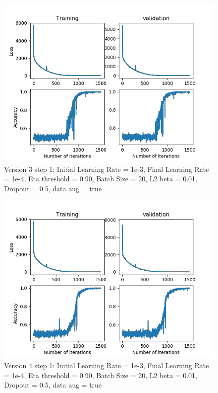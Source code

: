 \documentclass[12pt,reqno]{amsart}
\numberwithin{equation}{section}
\begin{document}
\begin{enumerate}
\begin{figure}[H]
\centering
\includegraphics[scale=0.6]{data_liquid15_version3_step1}
\caption{Version 3 step 1: Initial Learning Rate = 1e-3, Final Learning Rate = 1e-4, Eta threshold = 0.90, Batch Size = 20, L2 beta = 0.01, Dropout = 0.5, data aug = true}
\end{figure}

\begin{figure}[H]
\centering
\includegraphics[scale=0.6]{data_liquid15_version4_step1}
\caption{Version 4 step 1: Initial Learning Rate = 1e-3, Final Learning Rate = 1e-4, Eta threshold = 0.90, Batch Size = 20, L2 beta = 0.01, Dropout = 0.5, data aug = true}
\end{figure}


\end{enumerate}
\end{document}
